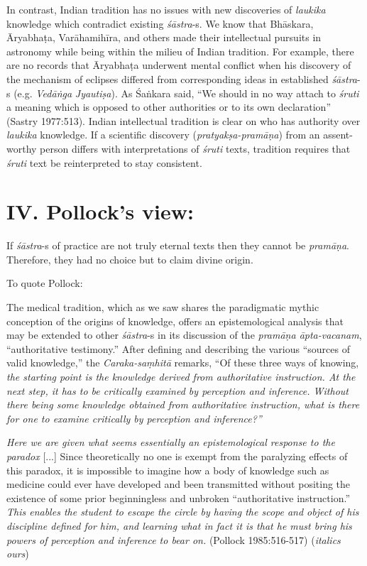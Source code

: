 In contrast, Indian tradition has no issues with new discoveries of {\sl laukika} knowledge which contradict existing {\sl śāstra}-s.  We know that Bhāskara, Āryabhaṭa, Varāhamihīra, and others made their intellectual pursuits in astronomy while being within the milieu of Indian tradition.  For example, there are no records that Āryabhaṭa underwent mental conflict when his discovery of the mechanism of eclipses differed from corresponding ideas in established \hbox{{\sl śāstra}-s} (e.g. {\sl Vedāṅga} {\sl Jyautiṣa}). As Śaṅkara said,  ``We should in no way attach to {\sl śruti} a meaning which is opposed to other authorities or to its own declaration'' (Sastry 1977:513). Indian intellectual tradition is clear on who has authority over {\sl laukika} knowledge.  If a scientific discovery ({\sl pratyakṣa-pramāṇa}) from an assent-worthy person differs with interpretations of {\sl śruti} texts, tradition requires that {\sl śruti} text be reinterpreted to stay consistent.

\section*{IV. Pollock's view:}

If {{\sl śāstra}\relax}-s of practice are not truly eternal texts then they cannot be {{\sl pramāṇa}\relax}.  Therefore, they had no choice but to claim divine origin.

To quote Pollock:
\begin{myquote}
The medical tradition, which as we saw shares the paradigmatic mythic conception of the origins of knowledge, offers an epistemological analysis that may be extended to other {\sl śāstra}-s in its discussion of the {\sl pra\-māṇa āpta-vacanam}, ``authoritative testimony.''  After defining and describing the various ``sources of valid knowledge,'' the {\sl Caraka-saṃhitā} remarks, ``Of these three ways of knowing, {\sl the starting point is the knowledge derived from authoritative instruction. At the next step, it has to be critically examined by perception and inference. Without there being some knowledge obtained from authoritative instruction, what is there for one to examine critically by perception and inference?''}

{{\sl Here we are given what seems essentially an epistemological response to the paradox}} [...] Since theoretically no one is exempt from the paralyzing effects of this paradox, it is impossible to imagine how a body of knowledge such as medicine could ever have developed and been transmitted without positing the existence of some prior beginningless and unbroken ``authoritative instruction.'' {\sl This enables the student to escape the circle by having the scope and object of his discipline defined for him, and learning what in fact it is that he must bring his powers of perception and inference to bear on.}
\hfill (Pollock 1985:516-517) ({\sl italics ours})
\end{myquote}

